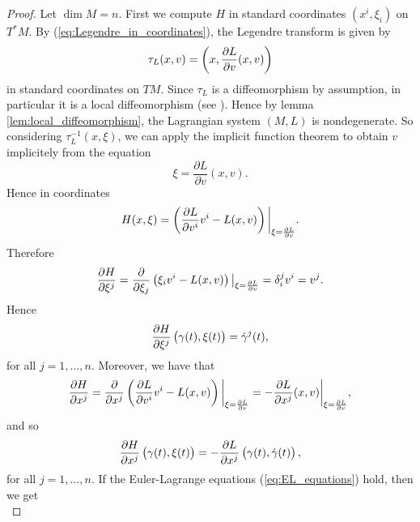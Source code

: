 \begin{proof}
	Let $\dim M = n$. First we compute $H$ in standard coordinates $(x^i,\xi_i)$ on $T^*M$. By (\ref{eq:Legendre_in_coordinates}), the Legendre transform is given by
	\begin{equation}
		\tau_L(x,v) = \del[3]{x,\frac{\partial L}{\partial v}(x,v)}
	\end{equation}
	\noindent in standard coordinates on $TM$. Since $\tau_L$ is a diffeomorphism by assumption, in particular it is a local diffeomorphism (see \cite[80]{lee:smooth_manifolds:2013}). Hence by lemma \ref{lem:local_diffeomorphism}, the Lagrangian system $(M,L)$ is nondegenerate. So considering $\tau^{-1}_L(x,\xi)$, we can apply the implicit function theorem \cite[661]{lee:smooth_manifolds:2013} to obtain $v$ implicitely from the equation
	\begin{equation*}
		\xi = \frac{\partial L}{\partial v}(x,v).
	\end{equation*}
	Hence in coordinates
	\begin{equation*}
		H(x,\xi) = \del[3]{\frac{\partial L}{\partial v^i}v^i - L(x,v)}\bigg\vert_{\xi = \frac{\partial L}{\partial v}}.
	\end{equation*}
	Therefore
	\begin{equation*}
		\frac{\partial H}{\partial \xi^j} = \frac{\partial}{\partial \xi_j} \del[1]{\xi_i v^i - L(x,v)}\big\vert_{\xi = \frac{\partial L}{\partial v}} = \delta^j_i v^i = v^j.
	\end{equation*}
	Hence
	\begin{equation*}
		\frac{\partial H}{\partial \xi^j}\del[1]{\gamma(t),\xi(t)} = \dot{\gamma}^j(t),
	\end{equation*}
	\noindent for all $j = 1,\dots,n$. Moreover, we have that
	\begin{equation*}
		\frac{\partial H}{\partial x^j} = \frac{\partial}{\partial x^j}\del[3]{\frac{\partial L}{\partial v^i}v^i - L(x,v)}\bigg\vert_{\xi = \frac{\partial L}{\partial v}} = - \frac{\partial L}{\partial x^j}(x,v)\bigg\vert_{\xi = \frac{\partial L}{\partial v}}, 
	\end{equation*}
	\noindent and so
	\begin{equation*}
		\frac{\partial H}{\partial x^j}\del[1]{\gamma(t),\xi(t)} = -\frac{\partial L}{\partial x^j}\del[1]{\gamma(t),\dot{\gamma}(t)},
	\end{equation*}
	\noindent for all $j = 1,\dots,n$. If the Euler-Lagrange equations (\ref{eq:EL_equations}) hold, then we get
	\begin{equation*}

\end{equation*}
\end{proof}
